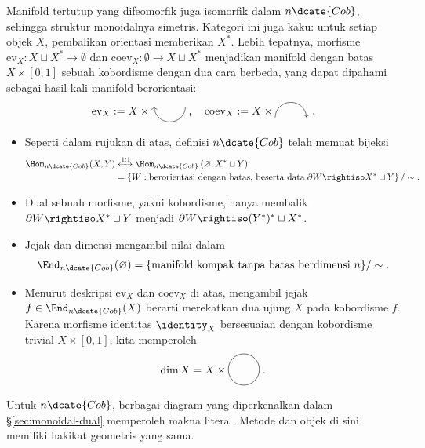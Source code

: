 \begin{example}[Kobordisme]
	Manifold tertutup yang difeomorfik juga isomorfik dalam $n\dcate{Cob}$,
	sehingga struktur monoidalnya simetris. Kategori ini juga kaku: untuk
	setiap objek $X$, pembalikan orientasi memberikan $X^*$. Lebih tepatnya,
	morfisme $\mathrm{ev}_X:X\sqcup X^*\to\emptyset$ dan
	$\mathrm{coev}_X:\emptyset\to X\sqcup X^*$ menjadikan manifold dengan
	batas $X\times[0,1]$ sebuah kobordisme dengan dua cara berbeda, yang
	dapat dipahami sebagai hasil kali manifold berorientasi:
	\begin{gather*}
		\mathrm{ev}_X := X \times
		\begin{tikzpicture}[baseline=(A), scale=0.5]
			\coordinate (A) at (0, -0.5);
			\draw[<-] (0, 0) arc[radius=1, start angle=180, end angle=360];
		\end{tikzpicture} \; , \quad
		\mathrm{coev}_X := X \times
		\begin{tikzpicture}[baseline=(A), scale=0.5]
			\coordinate (A) at (0, 0.2);
			\draw[->] (0, 0) arc[radius=1, start angle=180, end angle=0];
		\end{tikzpicture} \; .
	\end{gather*}
	\begin{itemize}
		\item Seperti dalam rujukan di atas, definisi $n\dcate{Cob}$ telah
		memuat bijeksi
		\begin{align*}
			\Hom_{n\dcate{Cob}}(X, Y) & \xleftrightarrow{1:1} \Hom_{n\dcate{Cob}}\left( \emptyset, X^* \sqcup Y\right) \\
			& = \left\{ W: \text{berorientasi dengan batas, beserta data}\; \partial W \rightiso X^* \sqcup Y \right\} / \sim .
		\end{align*}
		\item Dual sebuah morfisme, yakni kobordisme, hanya membalik
		$\partial W\rightiso X^*\sqcup Y$ menjadi
		$\partial W\rightiso(Y^*)^*\sqcup X^*$.
		\item Jejak dan dimensi mengambil nilai dalam
		\[ \End_{n\dcate{Cob}}(\emptyset)=
		\{\text{manifold kompak tanpa batas berdimensi }n\}/\sim . \]
		\item Menurut deskripsi $\mathrm{ev}_X$ dan $\mathrm{coev}_X$ di
		atas, mengambil jejak $f\in\End_{n\dcate{Cob}}(X)$ berarti merekatkan
		dua ujung $X$ pada kobordisme $f$. Karena morfisme identitas
		$\identity_X$ bersesuaian dengan kobordisme trivial
		$X\times[0,1]$, kita memperoleh
		\[ \dim X = X \times
		\begin{tikzpicture}[baseline=(O), scale=0.5]
			\coordinate (O) at (0, -0.25);
			\draw (0, 0) circle[radius=1];
		\end{tikzpicture} \; . \]
	\end{itemize}

	Untuk $n\dcate{Cob}$, berbagai diagram yang diperkenalkan dalam
	\S\ref{sec:monoidal-dual} memperoleh makna literal. Metode dan objek di
	sini memiliki hakikat geometris yang sama.
\end{example}
